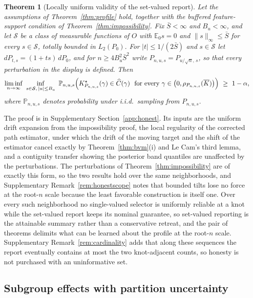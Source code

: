 \documentclass[11pt]{article}
\newtheorem{theorem}{Theorem}%
\newcommand{\E}{\mathbb E}
\newcommand{\Pp}{\mathbb P}
\newcommand{\calS}{\mathcal S}
\newcommand{\norm}[1]{\lVert #1\rVert}
\begin{document}
\begin{theorem}[Locally uniform validity of the set-valued report]\label{thm:honest}
Let the assumptions of Theorem~\ref{thm:profile} hold, together with the buffered feature-support condition of Theorem~\ref{thm:impossibility}. Fix $\bar S<\infty$ and $B_u<\infty$, and let $\calS$ be a class of measurable functions of $O$ with $\E_0s=0$ and $\norm{s}_\infty\le\bar S$ for every $s\in\calS$, totally bounded in $L_2(P_0)$. For $|t|\le1/(2\bar S)$ and $s\in\calS$ let $dP_{t,s}=(1+ts)\,dP_0$, and for $n\ge4B_u^2\bar S^2$ write $P_{n,u,s}=P_{u/\sqrt n,\,s}$, so that every perturbation in the display is defined. Then
\begin{equation*}
\liminf_{n\to\infty}\ \inf_{s\in\calS,\,|u|\le B_u}\ \Pp_{n,u,s}\Bigl(K^\star_{P_{n,u,s}}(\gamma)\in\widehat C(\gamma)\ \text{ for every }\gamma\in\bigl(0,\rho_{P_{n,u,s}}(\overline K)\bigr)\Bigr)\ \ge\ 1-\alpha,
\end{equation*}
where $\Pp_{n,u,s}$ denotes probability under i.i.d.\ sampling from $P_{n,u,s}$.
\end{theorem}
The proof is in Supplementary Section~\ref{app:honest}. Its inputs are the uniform drift expansion from the impossibility proof, the local regularity of the corrected path estimator, under which the drift of the moving target and the shift of the estimator cancel exactly by Theorem~\ref{thm:bvm}(i) and Le Cam's third lemma, and a contiguity transfer showing the posterior band quantiles are unaffected by the perturbations. The perturbations of Theorem~\ref{thm:impossibility} are of exactly this form, so the two results hold over the same neighborhoods, and Supplementary Remark~\ref{rem:honestscope} notes that bounded tilts lose no force at the root-$n$ scale because the least favorable construction is itself one. Over every such neighborhood no single-valued selector is uniformly reliable at a knot while the set-valued report keeps its nominal guarantee, so set-valued reporting is the attainable summary rather than a conservative retreat, and the pair of theorems delimits what can be learned about the profile at the root-$n$ scale. Supplementary Remark~\ref{rem:cardinality} adds that along these sequences the report eventually contains at most the two knot-adjacent counts, so honesty is not purchased with an uninformative set.


\subsection{Subgroup effects with partition uncertainty}\label{sec:effectstheory}
\end{document}
